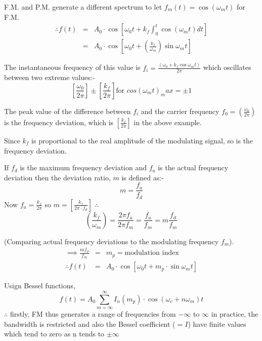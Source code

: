 \documentclass[11pt]{article} %
\begin{document}
F.M. and P.M. generate a different spectrum to let $f_m(t) = \cos{\left(\omega_mt\right)}$ for F.M.
\begin{eqnarray}
\therefore f(t) &=& A_0 \cdot \cos{\left[\omega_0t + k_f\int^t_0\cos{\left(\omega_mt\right)}dt\right]} \nonumber \\
&=& A_0\cdot\cos{\left[\omega_0t+\left( \frac{k_f}{\omega_m}\right)\sin{\omega_mt }\right]}
\end{eqnarray}

The instantaneous frequency of this value is $f_i = \frac{(\omega_0 +k_f\cos{\omega_mt})}{2\pi}$ which oscillates between two extreme values:-
\begin{equation}
\left[ \frac{\omega_0}{2\pi} \right] \pm \left[ \frac{k_f}{2\pi} \right] \mbox{for } cos(\omega_mt)_max=\pm 1
\end{equation}

The peak value of the difference between $f_i$ and the carrier frequency $f_0 = \left( \frac{\omega_0}{2\pi}\right)$ is the frequency deviation, which is $\left[ \frac{k_f}{2\pi}\right]$ in the above example.

Since $k_f$ is proportional to the real amplitude of the modulating signal, so is the frequency deviation.

If $f_d$ is the maximum frequency deviation and $f_a$ is the actual frequency deviation then the deviation ratio, $m$ is defined as:-
\begin{equation}
m=\frac{f_a}{f_d}
\end{equation}
Now $f_a = \frac{k_f}{2\pi}$ so $m=\left[\frac{k_f}{2\pi\cdot f_d}\right]$
$\therefore$ 
\begin{equation}
\left(\frac{k_f}{\omega_m}\right) = \frac{2\pi f_a}{2\pi f_m} = \frac{f_a}{f_m} = m\frac{f_d}{f_m}
\end{equation}

(Comparing actual frequency deviations to the modulating frequency $f_m$).
\begin{eqnarray}
\implies \frac{mf_d}{f_m} &=& m_p = \mbox{modulation index} \nonumber \\
\therefore f(t) &=& A_0 \cdot\cos{\left[\omega_0t+m_p\cdot\sin{\omega_mt}\right]}
\end{eqnarray}

Usign Bessel functions, 
\begin{equation}
	f(t) = A_0 \sum_{m=\infty}^{\infty}{I_n(m_p)\cdot \cos{(\omega_c + n\omega_m)}t}
\end{equation}
$\therefore$ firstly, FM thus generates a range of frequencies from $-\infty$ to $\infty$ in practice, the bandwidth is restricted and also the Bessel coefficient ($=I$) have finite values which tend to zero as n tends to $\pm \infty$
\end{document}
